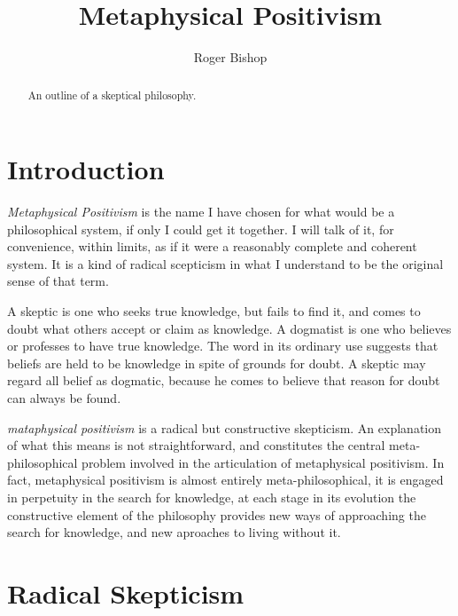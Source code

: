 \documentclass{rbjk}
\begin{document}
                                                                                   
\begin{article}
\begin{opening}  
\title{Metaphysical Positivism}
\author{Roger Bishop }

\begin{abstract}
An outline of a skeptical philosophy.
\end{abstract}
\end{opening}

\setcounter{tocdepth}{4}
{\parskip-0pt\tableofcontents}

\section{Introduction}

{\it Metaphysical Positivism} is the name I have chosen for what would be a philosophical system, if only I could get it together.
I will talk of it, for convenience, within limits, as if it were a reasonably complete and coherent system.
It is a kind of radical scepticism in what I understand to be the original sense of that term.

A skeptic is one who seeks true knowledge, but fails to find it, and comes to doubt what others accept or claim as knowledge.
A dogmatist is one who believes or professes to have true knowledge.
The word in its ordinary use suggests that beliefs are held to be knowledge in spite of grounds for doubt.
A skeptic may regard all belief as dogmatic, because he comes to believe that reason for doubt can always be found.

{\it mataphysical positivism} is a radical but constructive skepticism.
An explanation of what this means is not straightforward, and constitutes the central meta-philosophical problem involved in the articulation of metaphysical positivism.
In fact, metaphysical positivism is almost entirely meta-philosophical, it is engaged in perpetuity in the search for knowledge, at each stage in its evolution the constructive element of the philosophy provides new ways of approaching the search for knowledge, and new aproaches to living without it.

\section{Radical Skepticism}


\end{article}
\end{document}
